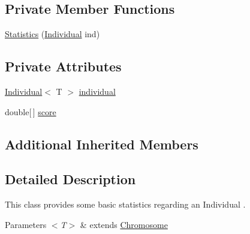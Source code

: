 \subsection*{Private Member Functions}
\begin{DoxyCompactItemize}
\item 
\hyperlink{classjenes_1_1population_1_1_individual_3_01_t_01extends_01_chromosome_01_4_1_1_statistics_3_01_t_01extends_01_chromosome_01_4_a0289ef85151e013c6dd80363f7d102ae}{Statistics} (\hyperlink{classjenes_1_1population_1_1_individual_3_01_t_01extends_01_chromosome_01_4_aaef7161bf62cee0ac95f079394fdac9f}{Individual} ind)
\end{DoxyCompactItemize}
\subsection*{Private Attributes}
\begin{DoxyCompactItemize}
\item 
\hyperlink{classjenes_1_1population_1_1_individual_3_01_t_01extends_01_chromosome_01_4_aaef7161bf62cee0ac95f079394fdac9f}{Individual}$<$ T $>$ \hyperlink{classjenes_1_1population_1_1_individual_3_01_t_01extends_01_chromosome_01_4_1_1_statistics_3_01_t_01extends_01_chromosome_01_4_a83d9d35fe1430fba8ee7e7004e30c03d}{individual}
\item 
double\mbox{[}$\,$\mbox{]} \hyperlink{classjenes_1_1population_1_1_individual_3_01_t_01extends_01_chromosome_01_4_1_1_statistics_3_01_t_01extends_01_chromosome_01_4_afa266e59b763737192a2a1698cf77121}{score}
\end{DoxyCompactItemize}
\subsection*{Additional Inherited Members}


\subsection{Detailed Description}
This class provides some basic statistics regarding an {\ttfamily  Individual }.


\begin{DoxyParams}{Parameters}
{\em $<$\-T$>$} & extends \hyperlink{}{Chromosome} \\
\hline
\end{DoxyParams}


